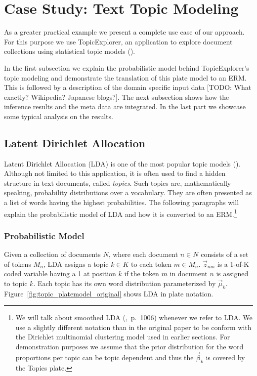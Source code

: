 \section{Case Study: Text Topic Modeling}\label{sec:casestudy}

As a greater practical example we present a complete use case of our approach. For this purpose we use TopicExplorer, an application to explore document collections using statistical topic models (\cite{hinneburg2012topicexplorer}).

In the first subsection we explain the probabilistic model behind TopicExplorer's topic modeling and demonstrate the translation of this plate model to an ERM. This is followed by a description of the domain specific input data [TODO: What exactly? Wikipedia? Japanese blogs?]. The next subsection shows how the inference results and the meta data are integrated. In the last part we showcase some typical analysis on the results.

\subsection{Latent Dirichlet Allocation}

Latent Dirichlet Allocation (LDA) is one of the most popular topic models (\cite{blei2003latent}). Although not limited to this application, it is often used to find a hidden structure in text documents, called \emph{topics}. Such topics are, mathematically speaking, probability distributions over a vocabulary. They are often presented as a list of words having the highest probabilities. The following paragraphs will explain the probabilistic model of LDA and how it is converted to an ERM.\footnote{We will talk about smoothed LDA (\cite{blei2003latent},~p.~1006) whenever we refer to LDA. We use a slightly different notation than in the original paper to be conform with the Dirichlet multinomial clustering model used in earlier sections. For demonstration purposes we assume that the prior distribution for the word proportions per topic can be topic dependent and thus the $\vec \beta_k$ is covered by the Topics plate.}

\subsubsection{Probabilistic Model}

Given a collection of documents $N$, where each document $n \in N$ consists of a set of tokens $M_n$, LDA assigns a topic $k \in K$ to each token $m \in M_n$. $\vec z_{nm}$ is a 1-of-K coded variable having a 1 at position $k$ if the token $m$ in document $n$ is assigned to topic $k$. Each topic has its own word distribution parameterized by $\vec \mu_k$. Figure~\ref{fig:topic_platemodel_original} shows LDA in plate notation.

